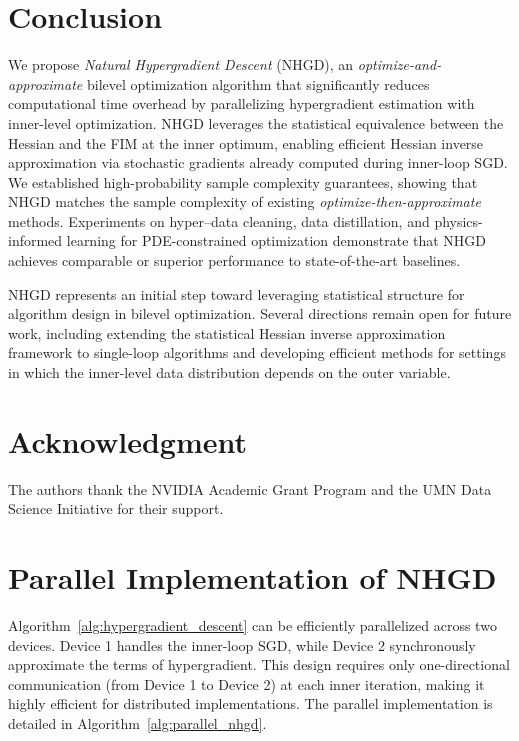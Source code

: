 \documentclass[11 pt]{article}
\begin{document}
\section{Conclusion}
We propose \emph{Natural Hypergradient Descent} (NHGD), an
\textit{optimize-and-approximate} bilevel optimization algorithm that
significantly reduces computational time overhead by parallelizing
hypergradient estimation with inner-level optimization.
NHGD leverages the statistical equivalence between the Hessian and the
FIM at the inner optimum, enabling efficient
Hessian inverse approximation via stochastic gradients already computed
during inner-loop SGD.
We established high-probability sample complexity guarantees, showing that NHGD
matches the sample complexity of existing
\textit{optimize-then-approximate} methods.
Experiments on hyper–data cleaning, data distillation, and
physics-informed learning for PDE-constrained optimization demonstrate
that NHGD achieves comparable or superior performance to state-of-the-art
baselines.

NHGD represents an initial step toward leveraging statistical structure for algorithm design in bilevel optimization. Several directions remain open for future work, including extending the statistical Hessian inverse approximation framework to single-loop algorithms and developing efficient methods for settings in which the inner-level data distribution depends on the outer variable.

\section*{Acknowledgment}
The authors thank the NVIDIA Academic Grant Program and the UMN Data Science Initiative for their support.





\newpage
\appendix

\section{Parallel Implementation of NHGD}\label{app:parallel_implementation}

Algorithm~\ref{alg:hypergradient_descent} can be efficiently parallelized across two devices. Device 1 handles the inner-loop SGD, while Device 2 synchronously approximate the terms of hypergradient. This design requires only one-directional communication (from Device 1 to Device 2) at each inner iteration, making it highly efficient for distributed implementations. The parallel implementation is detailed in Algorithm~\ref{alg:parallel_nhgd}.
\end{document}
